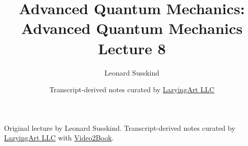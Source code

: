 \documentclass[11pt,oneside]{book}
\begin{document}
\frontmatter
\title{Advanced Quantum Mechanics: Advanced Quantum Mechanics Lecture 8}
\author{Leonard Susskind}
\date{Transcript-derived notes curated by \href{https://lazying.art}{LazyingArt LLC}}
\maketitle
\begin{center}
\small Original lecture by Leonard Susskind. Transcript-derived notes curated by \href{https://lazying.art}{LazyingArt LLC} with \href{https://github.com/lachlanchen/Video2Book}{Video2Book}.
\end{center}
\clearpage
\mainmatter

\end{document}
